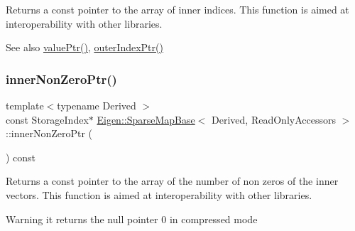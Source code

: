 \begin{DoxyReturn}{Returns}
a const pointer to the array of inner indices. This function is aimed at interoperability with other libraries. 
\end{DoxyReturn}
\begin{DoxySeeAlso}{See also}
\mbox{\hyperlink{class_eigen_1_1_sparse_compressed_base_a0f12f72d14b6c277d09be9f5ce2eab95}{value\+Ptr()}}, \mbox{\hyperlink{class_eigen_1_1_sparse_compressed_base_a53a82f962686e18c8dc07a4b9a85ed7b}{outer\+Index\+Ptr()}} 
\end{DoxySeeAlso}
\mbox{\label{class_eigen_1_1_sparse_map_base_3_01_derived_00_01_read_only_accessors_01_4_a2b35a1d701d6c6ea36b2d9f19660a68c}} 
\subsubsection{\texorpdfstring{innerNonZeroPtr()}{innerNonZeroPtr()}}
{\footnotesize\ttfamily template$<$typename Derived $>$ \\
const Storage\+Index$\ast$ \mbox{\hyperlink{class_eigen_1_1_sparse_map_base}{Eigen\+::\+Sparse\+Map\+Base}}$<$ Derived, Read\+Only\+Accessors $>$\+::inner\+Non\+Zero\+Ptr (\begin{DoxyParamCaption}{ }\end{DoxyParamCaption}) const\hspace{0.3cm}{\ttfamily [inline]}}





\begin{DoxyReturn}{Returns}
a const pointer to the array of the number of non zeros of the inner vectors. This function is aimed at interoperability with other libraries. 
\end{DoxyReturn}
\begin{DoxyWarning}{Warning}
it returns the null pointer 0 in compressed mode 
\end{DoxyWarning}
\mbox{\label{class_eigen_1_1_sparse_map_base_3_01_derived_00_01_read_only_accessors_01_4_a0df6dba8d71e0fb15b2995510853f83e}} 
